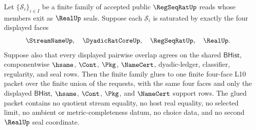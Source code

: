 \begin{theorem}
\label{thm:regseqrat-real-seal-finite-cover-gluing}
Let $\{\mathcal{S}_i\}_{i\in I}$ be a finite family of accepted public
$\RegSeqRatUp$ reads whose members exit as $\RealUp$ seals. Suppose each
$\mathcal{S}_i$ is saturated by exactly the four displayed faces
$$
\StreamNameUp,\quad \DyadicRatCoreUp,\quad \RegSeqRatUp,\quad \RealUp.
$$
Suppose also that every displayed pairwise overlap agrees on the shared
$\mathsf{BHist}$, componentwise $\hsame$, $\Cont$, $\Pkg$, $\NameCert$,
dyadic-ledger, classifier, regularity, and seal rows. Then the finite family
glues to one finite four-face L10 packet over the finite union of the
requests, with the same four faces and only the displayed
$\mathsf{BHist}$, $\hsame$, $\Cont$, $\Pkg$, and $\NameCert$ support rows.
The glued packet contains no quotient stream equality, no host real equality,
no selected limit, no ambient or metric-completeness datum, no choice data,
and no second $\RealUp$ seal coordinate.
\end{theorem}
